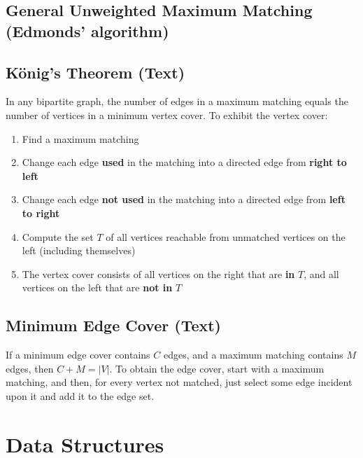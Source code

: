 \documentclass[12pt]{extarticle}
\begin{document}
\begin{multicols*}{2}
\subsection{General Unweighted Maximum Matching (Edmonds' algorithm)}


\subsection{K\"onig's Theorem (Text)} %
In any bipartite graph, the number of edges in a maximum matching equals the
number of vertices in a minimum vertex cover. To exhibit the vertex cover:
\begin{enumerate}
\item Find a maximum matching
\item Change each edge \textbf{used} in the matching into a directed edge from
\textbf{right to left}
\item Change each edge \textbf{not used} in the matching into a directed edge
from \textbf{left to right}
\item Compute the set $T$ of all vertices reachable from unmatched vertices on
the left (including themselves)
\item The vertex cover consists of all vertices on the right that are
\textbf{in} $T$, and all vertices on the left that are \textbf{not in} $T$
\end{enumerate}

\subsection{Minimum Edge Cover (Text)} %
If a minimum edge cover contains $C$ edges, and a maximum matching contains $M$
edges, then $C + M = |V|$. To obtain the edge cover, start with a maximum
matching, and then, for every vertex not matched, just select some edge
incident upon it and add it to the edge set. 


\section{Data Structures}

% 


\end{multicols*}
\end{document}
